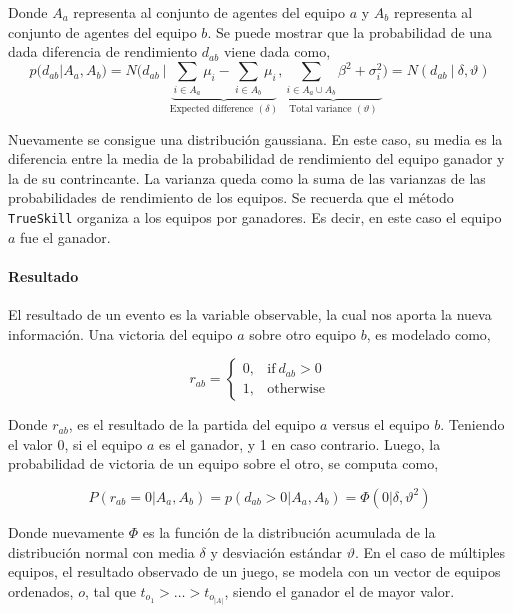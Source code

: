 \documentclass[11pt,twoside,spanish]{report} %
\begin{document}
Donde $A_a$ representa al conjunto de agentes del equipo $a$ y $A_b$ representa al conjunto de agentes del equipo $b$.
Se puede mostrar que la probabilidad de una dada diferencia de rendimiento $d_ {ab}$ viene dada como,
\begin{equation}\label{eq:proba_handicap}
p(d_{ab}|A_a,A_b) = N\Bigg(d_{ab} \ | \  \underbrace{\sum_{i\in A_a} \mu_i - \sum_{i\in A_b} \mu_i}_{\text{Expected difference }(\delta)},\underbrace{\sum_{i\in A_a\cup A_b} \beta^2 + \sigma_i^2}_{\text{Total variance }(\vartheta)}\Bigg) = N(d_{ab} \ | \  \delta, \vartheta )
\end{equation}

Nuevamente se consigue una distribuci\'on gaussiana.
En este caso, su media es la diferencia entre la media de la probabilidad de rendimiento del equipo ganador y la de su contrincante. 
La varianza queda como la suma de las varianzas de las probabilidades de rendimiento de los equipos.
Se recuerda que el m\'etodo \texttt{TrueSkill} organiza a los equipos por ganadores.
Es decir, en este caso el equipo $a$ fue el ganador.


\paragraph{Resultado}

El resultado de un evento es la variable observable, la cual nos aporta la nueva informaci\'on.
Una victoria del equipo $ a $ sobre otro equipo $ b $, es modelado como,

\begin{equation}
	r_{ab} =
	\begin{cases}
		0, & \text{if}\ d_{ab} > 0 \\
		1, & \text{otherwise}
	\end{cases}
\end{equation}

Donde $r_{ab}$, es el resultado de la partida del equipo $a$ versus el equipo $b$.
Teniendo el valor 0, si el equipo $a$ es el ganador, y 1 en caso contrario.
Luego, la probabilidad de victoria de un equipo sobre el otro, se computa como,


\begin{equation} \label{eq:proba_win}
P(r_{ab}=0|A_a,A_b) = p(d_{ab} > 0 | A_a,A_b) =  \Phi\left( 0| \delta, \vartheta^2 \right)
\end{equation}

Donde nuevamente $\Phi$ es la funci\'on de la distribuci\'on acumulada de la distribuci\'on normal con media $\delta$ y desviaci\'on est\'andar $\vartheta$.
En el caso de m\'ultiples equipos, el resultado observado de un juego, se modela con un vector de equipos ordenados, $o$, tal que $t_{o_1}> \dots > t_{o_{|A|}}$, siendo el ganador el de mayor valor.
\end{document}
